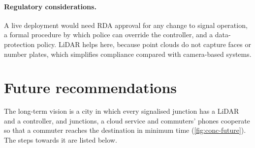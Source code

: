 \paragraph{Regulatory considerations.} A live deployment would need RDA approval for any change to signal operation, a formal procedure by which police can override the controller, and a data-protection policy. LiDAR helps here, because point clouds do not capture faces or number plates, which simplifies compliance compared with camera-based systems.

\section{Future recommendations}\label{sec:conc-future}

The long-term vision is a city in which every signalised junction has a LiDAR and a \prism{} controller, and junctions, a cloud service and commuters' phones cooperate so that a commuter reaches the destination in minimum time (\cref{fig:conc-future}). The steps towards it are listed below.


